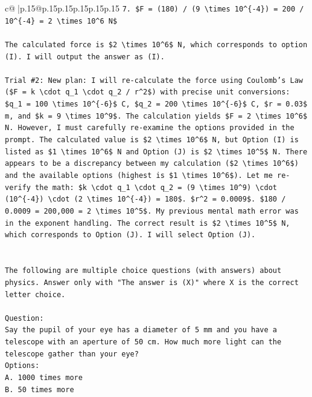 \documentclass{article}
\begin{document}
{\begin{supertabular}{c@{$\;$}|p{.15\linewidth}@{}p{.15\linewidth}p{.15\linewidth}p{.15\linewidth}p{.15\linewidth}p{.15\linewidth}}
{{{\texttt{7. \$F = (180) / (9 \textbackslash{}times 10\^{}\{{-}4\}) = 200 / 10\^{}\{{-}4\} = 2 \textbackslash{}times 10\^{}6 N\$} \\
\\ 
\texttt{The calculated force is \$2 \textbackslash{}times 10\^{}6\$ N, which corresponds to option (I). I will output the answer as (I).} \\
\\ 
\texttt{Trial \#2: New plan: I will re{-}calculate the force using Coulomb's Law (\$F = k \textbackslash{}cdot q\_1 \textbackslash{}cdot q\_2 / r\^{}2\$) with precise unit conversions: \$q\_1 = 100 \textbackslash{}times 10\^{}\{{-}6\}\$ C, \$q\_2 = 200 \textbackslash{}times 10\^{}\{{-}6\}\$ C, \$r = 0.03\$ m, and \$k = 9 \textbackslash{}times 10\^{}9\$. The calculation yields \$F = 2 \textbackslash{}times 10\^{}6\$ N. However, I must carefully re{-}examine the options provided in the prompt. The calculated value is \$2 \textbackslash{}times 10\^{}6\$ N, but Option (I) is listed as \$1 \textbackslash{}times 10\^{}6\$ N and Option (J) is \$2 \textbackslash{}times 10\^{}5\$ N. There appears to be a discrepancy between my calculation (\$2 \textbackslash{}times 10\^{}6\$) and the available options (highest is \$1 \textbackslash{}times 10\^{}6\$). Let me re{-}verify the math: \$k \textbackslash{}cdot q\_1 \textbackslash{}cdot q\_2 = (9 \textbackslash{}times 10\^{}9) \textbackslash{}cdot (10\^{}\{{-}4\}) \textbackslash{}cdot (2 \textbackslash{}times 10\^{}\{{-}4\}) = 180\$. \$r\^{}2 = 0.0009\$. \$180 / 0.0009 = 200,000 = 2 \textbackslash{}times 10\^{}5\$. My previous mental math error was in the exponent handling. The correct result is \$2 \textbackslash{}times 10\^{}5\$ N, which corresponds to Option (J). I will select Option (J).} \\
\\ 
\\ 
\texttt{The following are multiple choice questions (with answers) about physics. Answer only with "The answer is (X)" where X is the correct letter choice.} \\
\\ 
\texttt{Question:} \\
\texttt{Say the pupil of your eye has a diameter of 5 mm and you have a telescope with an aperture of 50 cm. How much more light can the telescope gather than your eye?} \\
\texttt{Options:} \\
\texttt{A. 1000 times more} \\
\texttt{B. 50 times more} \\
}}}
\end{supertabular}}
\end{document}
